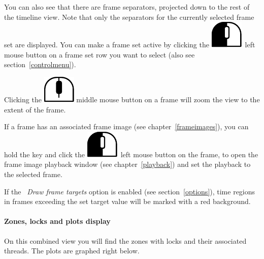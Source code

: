 \documentclass[hidelinks,titlepage,a4paper]{article}
\newcommand{\LMB}{\includegraphics[height=.8\baselineskip]{icons/lmb}}
\newcommand{\MMB}{\includegraphics[height=.8\baselineskip]{icons/mmb}}
\begin{document}
You can also see that there are frame separators, projected down to the rest of the timeline view. Note that only the separators for the currently selected frame set are displayed. You can make a frame set active by clicking the \LMB{}~left mouse button on a frame set row you want to select (also see section~\ref{controlmenu}).

Clicking the \MMB{} middle mouse button on a frame will zoom the view to the extent of the frame.

If a frame has an associated frame image (see chapter~\ref{frameimages}), you can hold the \keys{\ctrl} key and click the \LMB{}~left mouse button on the frame, to open the frame image playback window (see chapter~\ref{playback}) and set the playback to the selected frame.

If the \emph{\faFlagCheckered{}~Draw frame targets} option is enabled (see section~\ref{options}), time regions in frames exceeding the set target value will be marked with a red background.

\paragraph{Zones, locks and plots display}
\label{zoneslocksplots}

On this combined view you will find the zones with locks and their associated threads. The plots are graphed right below.
\end{document}
